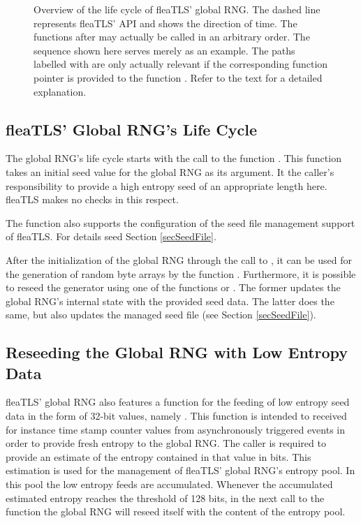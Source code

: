 \documentclass[a4paper,11pt]{scrartcl}
\begin{document}
\begin{figure}

\label{figRngLifeCycle}
\caption{Overview of the life cycle of fleaTLS' global RNG. The dashed line represents
fleaTLS' API and shows the direction of time. 
The functions after \funcLibInit may actually be called in an arbitrary order.
The sequence shown here serves merely as an example.
The paths labelled
with \funcSaveRngState are only actually relevant if the corresponding function
pointer is provided to the function \funcLibInit. Refer to the text for a
detailed explanation.}
\end{figure}

\subsection{fleaTLS' Global RNG's Life Cycle}
\label{secRngLifeCycle}
The global RNG's life cycle starts with the call to the function
. This function takes an initial seed value for
the global RNG as its argument. It the caller's responsibility to provide a high
entropy seed of an appropriate length here. fleaTLS makes no checks in this
respect. 

The function \funcLibInit also supports the configuration of the seed file
management support of fleaTLS. For details seed Section \ref{secSeedFile}.


After the initialization of the global RNG through the call to
, it can be used for the generation of random
byte arrays by the function . Furthermore,
it is possible to reseed the generator using one of the functions
 or 
. The former updates the global
RNG's internal state with the provided seed data. The latter does the same, but
also updates the managed seed file (see Section \ref{secSeedFile}).

\subsection{Reseeding the Global RNG with Low Entropy Data}
\label{secLowEntropyReseed}
fleaTLS' global RNG also features a function for the feeding of low entropy seed
data in the form of 32-bit values, namely
. This function is
intended to received for instance time stamp counter values from asynchronously
triggered events in order to provide fresh entropy to the global RNG. The caller
is required to provide an estimate of the entropy contained in that value in
bits. This estimation is used for the management of fleaTLS' global RNG's
entropy pool. In this pool the low entropy feeds are accumulated. Whenever the
accumulated estimated entropy reaches the threshold of 128 bits, in the next
call to the function  the global RNG will
reseed itself with the content of the entropy pool. 
\end{document}
